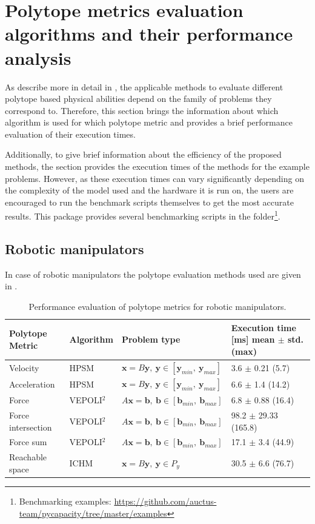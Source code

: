 \section{Polytope metrics evaluation algorithms and their performance analysis}
\label{sec:pycapacity_performance}
As describe more in detail in , the applicable methods to evaluate different polytope based physical abilities depend on the family of problems they correspond to. Therefore, this section brings the information about which algorithm is used for which polytope metric and provides a brief performance evaluation of their execution times.

Additionally, to give brief information about the efficiency of the proposed methods, the section provides the execution times of the methods for the example problems. However, as these execution times can vary significantly depending on the complexity of the model used and the hardware it is run on, the users are encouraged to run the benchmark scripts themselves to get the most accurate results. This package provides several benchmarking scripts in the  folder\footnote{\label{note:benchmarking_examples}Benchmarking examples: \url{https://github.com/auctus-team/pycapacity/tree/master/examples}}.

\subsection{Robotic manipulators}

In case of robotic manipulators the polytope evaluation methods used are given in .
\begin{table}[h]
\centering
\begin{tabular}{|l|l|l|l|}
\hline
Polytope Metric & Algorithm & Problem type & \makecell[c]{Execution time [ms] \\ mean $\pm$ std. (max)}  \\
\hline
Velocity & HPSM & $\bm{x}=B\bm{y},~ \bm{y} \in [\bm{y}_{min}, ~\bm{y}_{max}]$ & 3.6 $\pm$ 0.21 (5.7) \\
Acceleration & HPSM & $\bm{x}=B\bm{y},~ \bm{y} \in [\bm{y}_{min}, ~\bm{y}_{max}]$ & 6.6 $\pm$ 1.4 (14.2) \\
Force & VEPOLI$^2$ & $A\bm{x}=\bm{b}, ~\bm{b} \in [\bm{b}_{min}, ~\bm{b}_{max}]$ & 6.8 $\pm$ 0.88 (16.4) \\
Force intersection & VEPOLI$^2$ & $A\bm{x}=\bm{b},~\bm{b} \in [\bm{b}_{min}, ~\bm{b}_{max}]$ & 98.2 $\pm$ 29.33 (165.8) \\
Force sum & VEPOLI$^2$ & $A\bm{x}=\bm{b},~\bm{b} \in [\bm{b}_{min}, ~\bm{b}_{max}]$ & 17.1 $\pm$ 3.4 (44.9) \\
Reachable space & ICHM & $\bm{x}=B\bm{y},~ \bm{y} \in P_{y}$ & 30.5 $\pm$ 6.6 (76.7) \\
\hline
\end{tabular}
\caption{Performance evaluation of polytope metrics for robotic manipulators.}
\label{tab:methods_robots}
\end{table}


